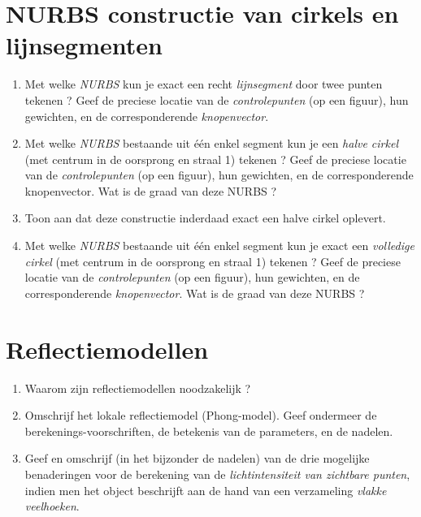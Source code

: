 \documentclass{report}
\begin{document}
	\section{NURBS constructie van cirkels en lijnsegmenten  }
	\begin{enumerate}
		\item Met welke \textit{NURBS} kun je exact een recht \textit{lijnsegment} door twee punten tekenen ? Geef de preciese locatie van de \textit{controlepunten} (op een figuur), hun gewichten, en de corresponderende \textit{knopenvector}.
		
		\item Met welke \textit{NURBS} bestaande uit één enkel segment kun je een \textit{halve cirkel} (met centrum in de oorsprong en straal 1) tekenen ? Geef de preciese locatie van de \textit{controlepunten} (op een figuur), hun gewichten, en de corresponderende knopenvector\textit{}. Wat is de graad van deze NURBS ?
		
		\item Toon aan dat deze constructie inderdaad exact een halve cirkel oplevert.
		
		\item Met welke \textit{NURBS} bestaande uit één enkel segment kun je exact een \textit{volledige cirkel} (met centrum in de oorsprong en straal 1) tekenen ? Geef de preciese locatie van de \textit{controlepunten} (op een figuur), hun gewichten, en de corresponderende \textit{knopenvector}. Wat is de graad van deze NURBS ?
	\end{enumerate}

	\section{Reflectiemodellen }
	\begin{enumerate}
		\item Waarom zijn reflectiemodellen noodzakelijk ?
		
		\item Omschrijf het lokale reflectiemodel (Phong-model). Geef ondermeer de
		 berekenings-voorschriften, de betekenis van de parameters, en de nadelen.
		 
		\item Geef en omschrijf (in het bijzonder de nadelen) van de drie mogelijke benaderingen voor de berekening van de \textit{lichtintensiteit van zichtbare punten}, indien men het object beschrijft aan de hand van een verzameling \textit{vlakke veelhoeken}.
		
	\end{enumerate}
\end{document}
